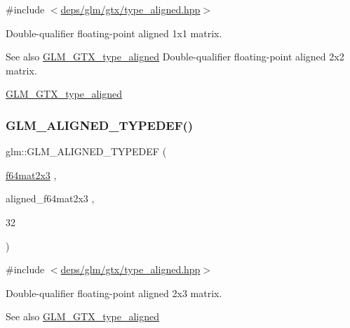 {\ttfamily \#include $<$\hyperlink{gtx_2type__aligned_8hpp}{deps/glm/gtx/type\+\_\+aligned.\+hpp}$>$}

Double-\/qualifier floating-\/point aligned 1x1 matrix. \begin{DoxySeeAlso}{See also}
\hyperlink{group__gtx__type__aligned}{G\+L\+M\+\_\+\+G\+T\+X\+\_\+type\+\_\+aligned} Double-\/qualifier floating-\/point aligned 2x2 matrix. 

\hyperlink{group__gtx__type__aligned}{G\+L\+M\+\_\+\+G\+T\+X\+\_\+type\+\_\+aligned} 
\end{DoxySeeAlso}
\mbox{\label{group__gtx__type__aligned_gab059d7b9fe2094acc563b7223987499f}} 
\subsubsection{\texorpdfstring{G\+L\+M\+\_\+\+A\+L\+I\+G\+N\+E\+D\+\_\+\+T\+Y\+P\+E\+D\+E\+F()}{GLM\_ALIGNED\_TYPEDEF()}\hspace{0.1cm}{\footnotesize\ttfamily [197/209]}}
{\footnotesize\ttfamily glm\+::\+G\+L\+M\+\_\+\+A\+L\+I\+G\+N\+E\+D\+\_\+\+T\+Y\+P\+E\+D\+EF (\begin{DoxyParamCaption}\item[{\hyperlink{group__gtc__type__precision_ga7816d266eaf216e384c3c6d1e570b9f3}{f64mat2x3}}]{,  }\item[{aligned\+\_\+f64mat2x3}]{,  }\item[{32}]{ }\end{DoxyParamCaption})}



{\ttfamily \#include $<$\hyperlink{gtx_2type__aligned_8hpp}{deps/glm/gtx/type\+\_\+aligned.\+hpp}$>$}

Double-\/qualifier floating-\/point aligned 2x3 matrix. \begin{DoxySeeAlso}{See also}
\hyperlink{group__gtx__type__aligned}{G\+L\+M\+\_\+\+G\+T\+X\+\_\+type\+\_\+aligned} 
\end{DoxySeeAlso}
\mbox{\label{group__gtx__type__aligned_gabbc811d1c52ed2b8cfcaff1378f75c69}} 

